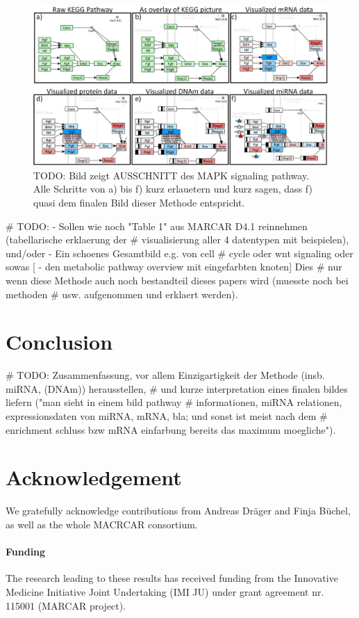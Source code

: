 \documentclass{bioinfo}
\begin{document}
\begin{figure}[t] \centering \includegraphics[width=1.0\textwidth]{figures/visualization-steps.png}
\caption{ TODO: Bild zeigt AUSSCHNITT des MAPK signaling pathway. Alle Schritte von a) bis f) kurz
erlauetern und kurz sagen, dass f) quasi dem finalen Bild dieser Methode
entspricht. }\label{fig:visualization_steps} \end{figure}


# TODO: - Sollen wie noch "Table 1" aus MARCAR D4.1 reinnehmen (tabellarische erklaerung der
# visualisierung aller 4 datentypen mit beispielen), und/oder - Ein schoenes Gesamtbild e.g. von cell
# cycle oder wnt signaling oder sowas [ - den metabolic pathway overview mit eingefarbten knoten] Dies
# nur wenn diese Methode auch noch bestandteil dieses papers wird (muesste noch bei methoden
# usw. aufgenommen und erklaert werden).


\section{Conclusion}

# TODO: Zusammenfassung, vor allem Einzigartigkeit der Methode (insb. miRNA, (DNAm)) herausstellen,
# und kurze interpretation eines finalen bildes liefern ("man sieht in einem bild pathway
# informationen, miRNA relationen, expressionsdaten von miRNA, mRNA, bla; und sonst ist meist nach dem
# enrichment schluss bzw mRNA einfarbung bereits das maximum moegliche").



\section*{Acknowledgement} 
We gratefully acknowledge contributions from Andreas Dr\"ager and Finja B\"uchel, as well as the
whole MACRCAR consortium.

\paragraph{Funding\textcolon} 
The research leading to these results has received funding from the Innovative Medicine Initiative
Joint Undertaking (IMI JU) under grant agreement nr. 115001 (MARCAR project).


%
%
%
%
%


\end{document}
